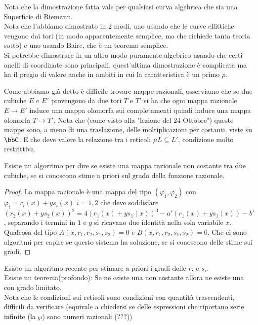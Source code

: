 
\begin{osservazione}
Nota che la dimostrazione fatta vale per qualsiasi curva algebrica che sia una Superficie di Riemann.\\
Nota che l'abbiamo dimostrato in 2 modi, uno usando che le curve ellittiche vengono dai tori (in modo apparentemente semplice, ma che richiede tanta teoria sotto) e uno usando Baire, che è un teorema semplice.\\
Si potrebbe dimostrare in un altro modo puramente algebrico usando che certi anelli di coordinate sono principali, quest'ultima dimostrazione è complicata ma ha il pregio di valere anche in ambiti in cui la caratteristica è un primo $p$.
\end{osservazione}

Come abbiamo già detto è difficile trovare mappe razionali, osserviamo che se due cubiche $E$ e $E'$ provengono da due tori $T$ e $T'$ si ha che ogni mappa razionale $E\rightarrow E'$ induce una mappa olomorfa sui completamenti quindi induce una mappa olomorfa $T\rightarrow T'$. Nota che (come visto alla "lezione del 24 Ottobre") queste mappe sono, a meno di una traslazione, delle moltiplicazioni per costanti, viste su $\bbC$. E che deve valere la relazione tra i reticoli $\mu L\subseteq L'$, condizione molto restrittiva.

\begin{proposizione}
Esiste un algoritmo per dire se esiste una mappa razionale non costante tra due cubiche, se si conoscono stime a priori sul grado della funzione razionale.
\end{proposizione}

\begin{proof} La mappa razionale è una mappa del tipo $(\varphi_1,\varphi_2)$ con $\varphi_i=r_i(x)+y s_i(x)$ $i=1,2$  che deve soddisfare $(r_2(x)+y s_2(x))^2=4(r_1(x)+y s_1(x))^3-a'(r_1(x)+y s_1(x))-b'$, separando i termini in $1$ e $y$ si ricavano due identità nella sola variabile $x$. Qualcosa del tipo $A(x,r_1,r_2,s_1,s_2)=0$ e $B(x,r_1,r_2,s_1,s_2)=0$. Che ci sono algoritmi per capire se questo sistema ha soluzione, se si conoscono delle stime sui gradi.
\end{proof}

\begin{osservazione} Esiste un algoritmo recente per stimare a priori i gradi delle $r_i$ e $s_i$.\\
Esiste un teorema(profondo): Se ne esiste una non costante allora ne esiste una con grado limitato.\\
Nota che le condizioni sui reticoli sono condizioni con quantità trascendenti, difficili da verificare (equivale a chiedersi se delle espressioni che riportano serie infinite (la $\wp$) sono numeri razionali (???))
\end{osservazione}

